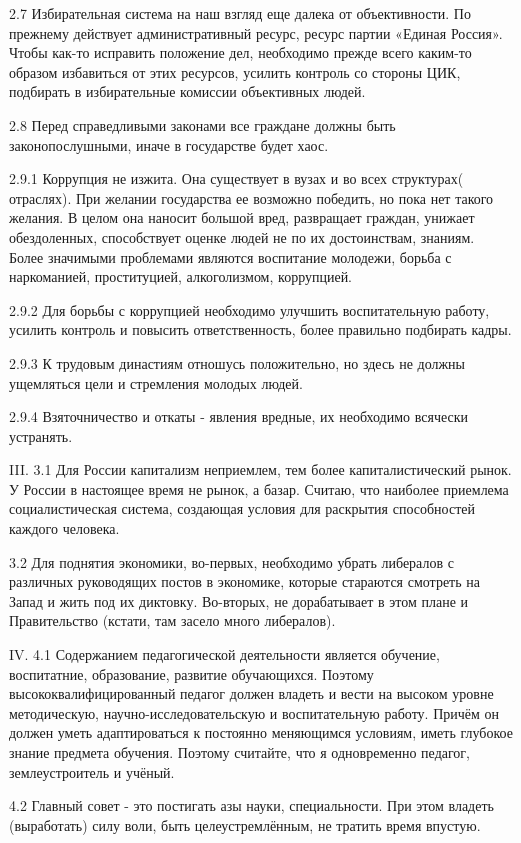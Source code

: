 2.7 Избирательная система на наш взгляд еще далека от объективности. По прежнему действует административный ресурс, ресурс партии «Единая Россия». Чтобы как-то исправить положение дел, необходимо прежде всего каким-то образом избавиться от этих ресурсов, усилить контроль со стороны ЦИК, подбирать в избирательные комиссии объективных людей.

2.8 Перед справедливыми законами все граждане должны быть законопослушными, иначе в государстве будет хаос.

2.9.1 Коррупция не изжита. Она существует в вузах и во всех структурах( отраслях). При желании государства ее возможно победить, но пока нет такого желания. В целом она наносит большой вред, развращает граждан, унижает обездоленных, способствует оценке людей не по их достоинствам, знаниям. Более значимыми проблемами являются воспитание молодежи, борьба с наркоманией, проституцией, алкоголизмом, коррупцией.

2.9.2 Для борьбы с коррупцией необходимо улучшить воспитательную работу, усилить контроль и повысить ответственность, более правильно подбирать кадры.
 
2.9.3 К трудовым династиям отношусь положительно, но здесь не должны ущемляться цели и стремления молодых людей.

2.9.4 Взяточничество и откаты - явления вредные, их необходимо всячески устранять.

III.
3.1 Для России капитализм неприемлем, тем более капиталистический рынок. У России в настоящее время не рынок, а базар. Считаю, что наиболее приемлема социалистическая система, создающая условия для раскрытия  способностей каждого человека.

3.2 Для поднятия экономики, во-первых, необходимо убрать либералов с различных руководящих постов в экономике, которые стараются смотреть на Запад и жить под их диктовку. Во-вторых, не дорабатывает в этом плане и Правительство (кстати, там засело много либералов).

IV.
4.1 Содержанием педагогической деятельности является обучение, воспитатние, образование, развитие обучающихся. Поэтому высококвалифицированный педагог  должен владеть и вести на высоком уровне методическую, научно-исследовательскую и воспитательную работу. Причём он должен уметь адаптироваться к постоянно меняющимся условиям, иметь глубокое знание предмета обучения. Поэтому считайте, что я одновременно педагог, землеустроитель и учёный.

4.2 Главный совет - это постигать азы науки, специальности. При этом владеть (выработать) силу воли, быть целеустремлённым, не тратить время впустую.

